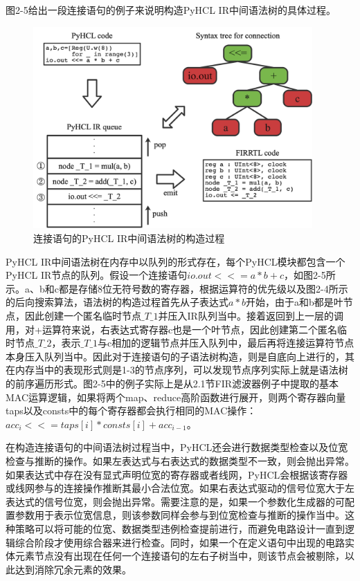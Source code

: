 图2-5给出一段连接语句的例子来说明构造PyHCL IR中间语法树的具体过程。

\begin{figure}[htbp]
	\centering
	\includegraphics[width=0.95\textwidth]{Photos/Connections-backwared_search.jpg}
	\caption{连接语句的PyHCL IR中间语法树的构造过程}
\end{figure}

PyHCL IR中间语法树在内存中以队列的形式存在，每个PyHCL模块都包含一个PyHCL IR节点的队列。假设一个连接语句$io.out <<= a*b+c$，如图2-5所示。a、b和c都是存储8位无符号数的寄存器，根据运算符的优先级以及图2-4所示的后向搜索算法，语法树的构造过程首先从子表达式$a*b$开始，由于a和b都是叶节点，因此创建一个匿名临时节点$\_T\_1$并压入IR队列当中。接着返回到上一层的调用，对+运算符来说，右表达式寄存器c也是一个叶节点，因此创建第二个匿名临时节点$\_T\_2$，表示$\_T\_1$与c相加的逻辑节点并压入队列中，最后再将连接运算符节点本身压入队列当中。因此对于连接语句的子语法树构造，则是自底向上进行的，其在内存当中的表现形式则是1-3的节点序列，可以发现节点序列实际上就是语法树的前序遍历形式。图2-5中的例子实际上是从2.1节FIR滤波器例子中提取的基本MAC运算逻辑，如果将两个map、reduce高阶函数进行展开，则两个寄存器向量taps以及consts中的每个寄存器都会执行相同的MAC操作：$acc_i <<= taps[i] * consts[i] + acc_{i-1}$。

在构造连接语句的中间语法树过程当中，PyHCL还会进行数据类型检查以及位宽检查与推断的操作。如果左表达式与右表达式的数据类型不一致，则会抛出异常。如果表达式中存在没有显式声明位宽的寄存器或者线网，PyHCL会根据该寄存器或线网参与的连接操作推断其最小合法位宽。如果右表达式驱动的信号位宽大于左表达式的信号位宽，则会抛出异常。需要注意的是，如果一个参数化生成器的可配置参数用于表示位宽信息，则该参数同样会参与到位宽检查与推断的操作当中。这种策略可以将可能的位宽、数据类型违例检查提前进行，而避免电路设计一直到逻辑综合阶段才使用综合器来进行检查。同时，如果一个在定义语句中出现的电路实体元素节点没有出现在任何一个连接语句的左右子树当中，则该节点会被剔除，以此达到消除冗余元素的效果。

